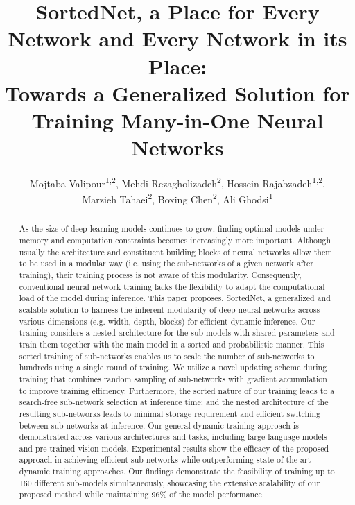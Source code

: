 \documentclass[letterpaper]{article} %
\title{SortedNet, a Place for Every Network and Every Network in its Place: \\ Towards a Generalized Solution for Training Many-in-One Neural Networks}
\author{
    Mojtaba Valipour\textsuperscript{\rm 1,\rm 2},
    Mehdi Rezagholizadeh\textsuperscript{\rm 2},
    Hossein Rajabzadeh\textsuperscript{\rm 1,\rm 2},\\
    Marzieh Tahaei\textsuperscript{\rm 2},
    Boxing Chen\textsuperscript{\rm 2},
    Ali Ghodsi\textsuperscript{\rm 1}
}
\begin{document}
\maketitle

\begin{abstract}
As the size of deep learning models continues to grow, finding optimal models under memory and computation constraints becomes increasingly more important. Although usually the architecture and constituent building blocks of neural networks allow them to be used in a modular way (i.e. using the sub-networks of a given network after training), their training process is not aware of this modularity. Consequently, conventional neural network training lacks the flexibility to adapt the computational load of the model during inference. This paper proposes, SortedNet, a generalized and scalable solution to harness the inherent modularity of deep neural networks across various dimensions (e.g. width, depth, blocks) for efficient dynamic inference. Our training considers a nested architecture for the sub-models with shared parameters and train them together with the main model in a sorted and probabilistic manner. This sorted training of sub-networks enables us to scale the number of sub-networks to hundreds using a single round of training. We utilize a novel updating scheme during training that combines random sampling of sub-networks with gradient accumulation to improve training efficiency. Furthermore, the sorted nature of our training leads to a search-free sub-network selection at inference time; and the nested architecture of the resulting sub-networks leads to minimal storage requirement and efficient switching between sub-networks at inference. Our general dynamic training approach is demonstrated across various architectures and tasks, including large language models and pre-trained vision models. Experimental results show the efficacy of the proposed approach in achieving efficient sub-networks while outperforming state-of-the-art dynamic training approaches. Our findings demonstrate the feasibility of training up to 160 different sub-models simultaneously, showcasing the extensive scalability of our proposed method while maintaining 96\% of the model performance. %



\end{abstract}
\end{document}
